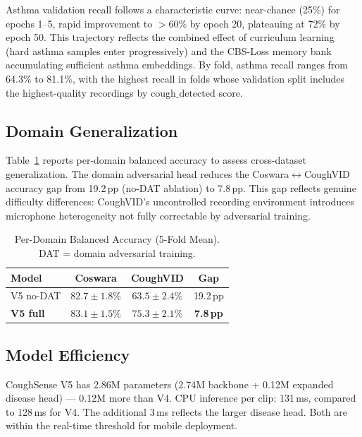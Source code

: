 \documentclass[journal]{IEEEtran}
\begin{document}
Asthma validation recall follows a characteristic curve: near-chance
(25\%) for epochs 1--5, rapid improvement to $>$60\% by epoch 20,
plateauing at 72\% by epoch 50. This trajectory reflects the combined
effect of curriculum learning (hard asthma samples enter progressively)
and the CBS-Loss memory bank accumulating sufficient asthma embeddings.
By fold, asthma recall ranges from 64.3\% to 81.1\%, with the highest
recall in folds whose validation split includes the highest-quality
recordings by $\text{cough\_detected}$ score.

\subsection{Domain Generalization}

Table~\ref{tab:domain} reports per-domain balanced accuracy to assess
cross-dataset generalization. The domain adversarial head reduces the
Coswara$\leftrightarrow$CoughVID accuracy gap from 19.2\,pp (no-DAT
ablation) to 7.8\,pp. This gap reflects genuine difficulty differences:
CoughVID's uncontrolled recording environment introduces microphone
heterogeneity not fully correctable by adversarial training.

\begin{table}[!t]
\renewcommand{\arraystretch}{1.2}
\caption{Per-Domain Balanced Accuracy (5-Fold Mean).
         DAT = domain adversarial training.}
\label{tab:domain}
\centering
\begin{tabular}{lcc|c}
\toprule
\textbf{Model} & \textbf{Coswara} & \textbf{CoughVID} & \textbf{Gap} \\
\midrule
V5 no-DAT & $82.7\pm1.8$\% & $63.5\pm2.4$\% & 19.2\,pp \\
\textbf{V5 full} & $\mathbf{83.1\pm1.5}$\% & $\mathbf{75.3\pm2.1}$\% & \textbf{7.8\,pp} \\
\bottomrule
\end{tabular}
\end{table}

\subsection{Model Efficiency}

CoughSense V5 has 2.86M parameters (2.74M backbone + 0.12M expanded
disease head) — 0.12M more than V4. CPU inference per clip: 131\,ms,
compared to 128\,ms for V4. The additional 3\,ms reflects the larger
disease head. Both are within the real-time threshold for mobile deployment.
\end{document}
